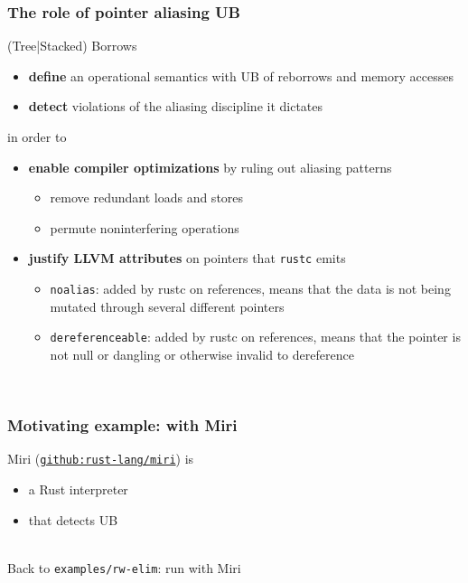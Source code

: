 \begin{frame}
    \frametitle{The role of pointer aliasing UB}
    (Tree|Stacked) Borrows
    \begin{itemize}
        \item \textbf{define} an operational semantics with UB of reborrows and memory accesses
        \item \textbf{detect} violations of the aliasing discipline it dictates
    \end{itemize}
    in order to
    \begin{itemize}
        \item \textbf{enable compiler optimizations} by ruling out aliasing patterns
            \begin{itemize}
                \item remove redundant loads and stores
                \item permute noninterfering operations
            \end{itemize}
        \item \textbf{justify LLVM attributes} on pointers that \texttt{rustc} emits
            \begin{itemize}
                \item \texttt{noalias}: added by rustc on references, means that the data
                    is not being mutated through several different pointers
                \item \texttt{dereferenceable}: added by rustc on references, means that
                    the pointer is not null or dangling or otherwise invalid to dereference
            \end{itemize}
    \end{itemize}~\\
\end{frame}

\begin{frame}[fragile]
    \frametitle{Motivating example: with Miri}
    Miri (\href{https://github.com/rust-lang/miri}{\texttt{github:rust-lang/miri}}) is
    \begin{itemize}
        \item a Rust interpreter
        \item that detects UB
    \end{itemize}~\\

    Back to \texttt{examples/rw-elim}: run with Miri
\end{frame}

